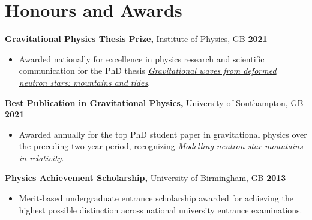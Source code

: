 \section{Honours and Awards}

\textbf{Gravitational Physics Thesis Prize,} Institute of Physics, GB
\hfill \textbf{2021}%
%
\vspace*{0.05in}
\begin{itemize}
    \item[] Awarded nationally for excellence in physics research and
    scientific communication for the PhD thesis
    \href{https://eprints.soton.ac.uk/452900/}%
    {\textit{Gravitational waves from deformed neutron stars: mountains and tides}}.
\end{itemize}

\textbf{Best Publication in Gravitational Physics,}
University of Southampton, GB
\hfill \textbf{2021}%
%
\vspace*{0.05in}
\begin{itemize}
    \item[] Awarded annually for the top PhD student paper in gravitational
    physics over the preceding two-year period, recognizing
    \href{https://doi.org/10.1093/mnras/stab2048}%
    {\textit{Modelling neutron star mountains in relativity}}.
\end{itemize}

\textbf{Physics Achievement Scholarship,} University of Birmingham, GB
\hfill \textbf{2013}%
%
\vspace*{0.05in}
\begin{itemize}
    \item[] Merit-based undergraduate entrance scholarship awarded for
    achieving the highest possible distinction across national university
    entrance examinations.
\end{itemize}
